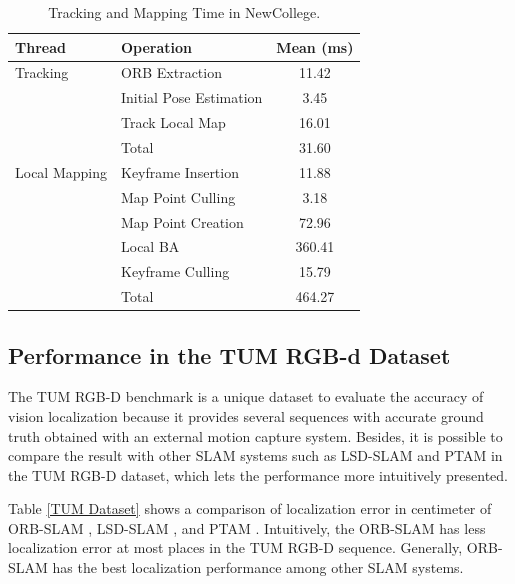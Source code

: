 \documentclass[letterpaper, 10 pt, conference]{ieeeconf}  %
\begin{document}
\begin{table}[h!]
\caption{Tracking and Mapping Time in NewCollege.}
\label{Efficiency_Newcollege}
\centering
\begin{tabular}{ l l c } 
\hline
 \hline
 Thread & Operation & Mean (ms) \\ 
 \hline
 Tracking & ORB Extraction & 11.42\\ 
 		  & Initial Pose Estimation & 3.45\\ 
 		  & Track Local Map & 16.01\\ 
 		  & Total & 31.60\\ 
 Local Mapping & Keyframe Insertion & 11.88\\ 
 		       & Map Point Culling & 3.18\\ 
 		       & Map Point Creation & 72.96\\ 
 		       & Local BA & 360.41\\
 		       & Keyframe Culling & 15.79\\
 		       & Total & 464.27\\
\hline
 \hline
\end{tabular}
\end{table}
%
 
\subsection{Performance in the TUM RGB-d Dataset \cite{38}}
The TUM RGB-D benchmark is a unique dataset to evaluate the accuracy of vision localization because it provides several sequences with accurate ground truth obtained with an external motion capture system. Besides, it is possible to compare the result with other SLAM systems such as LSD-SLAM and PTAM in the TUM RGB-D dataset, which lets the performance more intuitively presented.

Table \ref{TUM Dataset} shows a comparison of localization error in centimeter of ORB-SLAM \cite{ORBSLAM}, LSD-SLAM \cite{LSD}, and PTAM \cite{PTAM}. Intuitively, the ORB-SLAM has less localization error at most places in the TUM RGB-D sequence. Generally, ORB-SLAM has the best localization performance among other SLAM systems.
\end{document}
